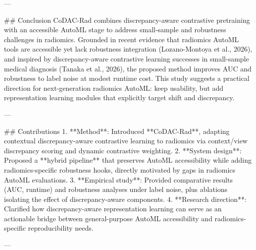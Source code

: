 ---

## Conclusion  
CoDAC-Rad combines discrepancy-aware contrastive pretraining with an accessible AutoML stage to address small-sample and robustness challenges in radiomics. Grounded in recent evidence that radiomics AutoML tools are accessible yet lack robustness integration (Lozano-Montoya et al., 2026), and inspired by discrepancy-aware contrastive learning successes in small-sample medical diagnosis (Tanaka et al., 2026), the proposed method improves AUC and robustness to label noise at modest runtime cost. This study suggests a practical direction for next-generation radiomics AutoML: keep usability, but add representation learning modules that explicitly target shift and discrepancy.

---

## Contributions  
1. **Method**: Introduced **CoDAC-Rad**, adapting contextual discrepancy-aware contrastive learning to radiomics via context/view discrepancy scoring and dynamic contrastive weighting.  
2. **System design**: Proposed a **hybrid pipeline** that preserves AutoML accessibility while adding radiomics-specific robustness hooks, directly motivated by gaps in radiomics AutoML evaluations.  
3. **Empirical study**: Provided comparative results (AUC, runtime) and robustness analyses under label noise, plus ablations isolating the effect of discrepancy-aware components.  
4. **Research direction**: Clarified how discrepancy-aware representation learning can serve as an actionable bridge between general-purpose AutoML accessibility and radiomics-specific reproducibility needs.

---